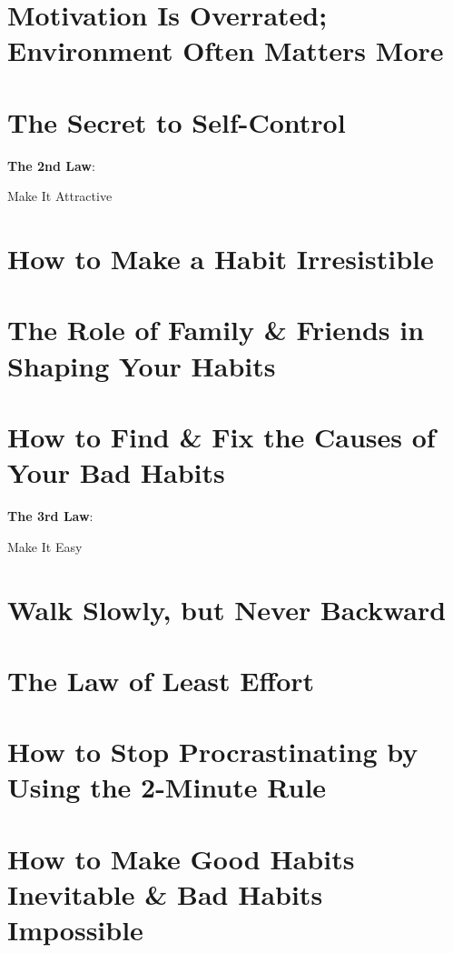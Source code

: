 \documentclass[oneside]{article}
\numberwithin{equation}{section}
\begin{document}
\section{Motivation Is Overrated; Environment Often Matters More}

\section{The Secret to Self-Control}

\begin{center}\huge
    \textbf{The 2nd Law}:
    
    Make It Attractive
\end{center}

\section{How to Make a Habit Irresistible}

\section{The Role of Family \& Friends in Shaping Your Habits}

\section{How to Find \& Fix the Causes of Your Bad Habits}

\begin{center}\huge
    \textbf{The 3rd Law}:
    
    Make It Easy
\end{center}

\section{Walk Slowly, but Never Backward}

\section{The Law of Least Effort}

\section{How to Stop Procrastinating by Using the 2-Minute Rule}

\section{How to Make Good Habits Inevitable \& Bad Habits Impossible}
\end{document}
